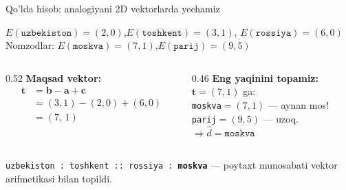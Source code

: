 \documentclass[aspectratio=169,11pt]{beamer}
\begin{document}
\begin{frame}{Qo'lda hisob: analogiyani 2D vektorlarda yechamiz}
  \begin{tcolorbox}[defbox,title=Kichik embedding fazosi (2D)]
    \small
    $E(\texttt{uzbekiston})=(2,0)$,\quad $E(\texttt{toshkent})=(3,1)$,\quad
    $E(\texttt{rossiya})=(6,0)$\\[2pt]
    Nomzodlar: $E(\texttt{moskva})=(7,1)$,\quad $E(\texttt{parij})=(9,5)$
  \end{tcolorbox}
  \vspace{0.2em}
  \begin{columns}[T]
    \begin{column}{0.52\textwidth}
      \textbf{Maqsad vektor:}
      \begin{align*}
        \mathbf{t} &= \mathbf{b}-\mathbf{a}+\mathbf{c}\\
          &= (3,1)-(2,0)+(6,0)\\
          &= (7,\,1)
      \end{align*}
    \end{column}
    \begin{column}{0.46\textwidth}
      \textbf{Eng yaqinini topamiz:}\\[3pt]
      \small
      $\mathbf{t}=(7,1)$ ga:\\
      \texttt{moskva}$=(7,1)$ --- aynan mos!\\
      \texttt{parij}$=(9,5)$ --- uzoq.\\[4pt]
      $\Rightarrow \hat{d}=\texttt{moskva}$
    \end{column}
  \end{columns}
  \vspace{4pt}
  \begin{tcolorbox}[okbox,title=Javob,top=2pt,bottom=2pt]
    \footnotesize
    \texttt{uzbekiston : toshkent :: rossiya : \textbf{moskva}} ---
    poytaxt munosabati vektor arifmetikasi bilan topildi.
  \end{tcolorbox}
\end{frame}
\end{document}
